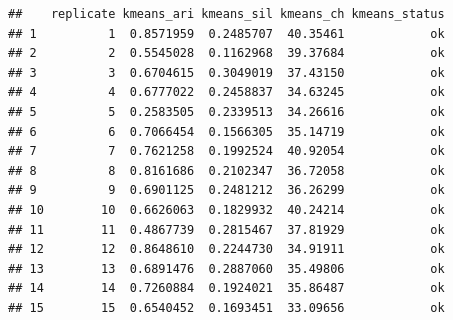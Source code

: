 \documentclass[
  11pt,
]{article}
\begin{document}
\begin{verbatim}
##    replicate kmeans_ari kmeans_sil kmeans_ch kmeans_status
## 1          1  0.8571959  0.2485707  40.35461            ok
## 2          2  0.5545028  0.1162968  39.37684            ok
## 3          3  0.6704615  0.3049019  37.43150            ok
## 4          4  0.6777022  0.2458837  34.63245            ok
## 5          5  0.2583505  0.2339513  34.26616            ok
## 6          6  0.7066454  0.1566305  35.14719            ok
## 7          7  0.7621258  0.1992524  40.92054            ok
## 8          8  0.8161686  0.2102347  36.72058            ok
## 9          9  0.6901125  0.2481212  36.26299            ok
## 10        10  0.6626063  0.1829932  40.24214            ok
## 11        11  0.4867739  0.2815467  37.81929            ok
## 12        12  0.8648610  0.2244730  34.91911            ok
## 13        13  0.6891476  0.2887060  35.49806            ok
## 14        14  0.7260884  0.1924021  35.86487            ok
## 15        15  0.6540452  0.1693451  33.09656            ok
\end{verbatim}
\end{document}
